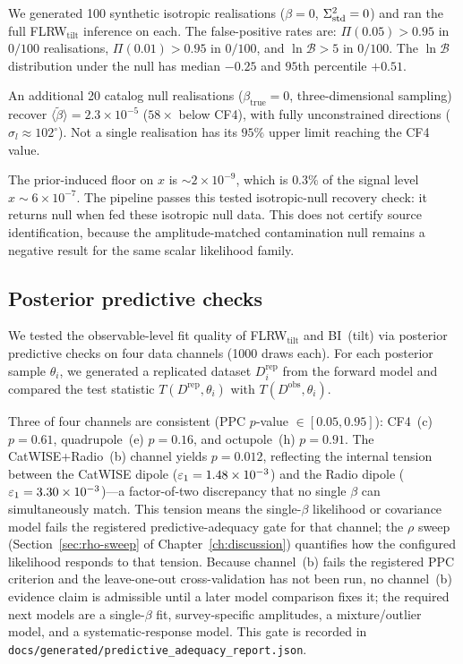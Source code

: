 We generated 100 synthetic isotropic realisations ($\beta = 0$,
$\Sigma^2_{\mathrm{std}} = 0$) and ran the full FLRW$_\mathrm{tilt}$ inference
on each.  The false-positive rates are: $\Pi(0.05) > 0.95$ in
$0/100$ realisations, $\Pi(0.01) > 0.95$ in $0/100$, and
$\ln\mathcal{B} > 5$ in $0/100$.  The $\ln\mathcal{B}$
distribution under the null has median $-0.25$ and $95$th
percentile $+0.51$.

An additional 20 catalog null realisations ($\beta_{\mathrm{true}} = 0$,
three-dimensional sampling) recover
$\langle\tilde{\beta}\rangle = 2.3 \times 10^{-5}$ ($58\times$
below CF4), with fully unconstrained directions
($\sigma_l \approx 102^\circ$).  Not a single realisation has its
$95\%$ upper limit reaching the CF4 value.

The prior-induced floor on $x$ is $\sim 2 \times 10^{-9}$,
which is $0.3\%$ of the signal level $x \sim 6 \times 10^{-7}$.
The pipeline passes this tested isotropic-null recovery check:
it returns null when fed these isotropic null data.  This does
not certify source identification, because the amplitude-matched
contamination null remains a negative result for the same scalar
likelihood family.


\subsection{Posterior predictive checks}
\label{sec:ppc}

We tested the observable-level fit quality of FLRW$_{\mathrm{tilt}}$
and BI~(tilt) via posterior predictive checks on four data
channels (1000 draws each).  For each posterior sample $\theta_i$,
we generated a replicated dataset $D_i^{\mathrm{rep}}$ from the
forward model and compared the test statistic
$T(D^{\mathrm{rep}}, \theta_i)$ with
$T(D^{\mathrm{obs}}, \theta_i)$.

Three of four channels are consistent (PPC $p$-value
$\in [0.05, 0.95]$): CF4~(c) $p = 0.61$, quadrupole~(e)
$p = 0.16$, and octupole~(h) $p = 0.91$.  The
CatWISE+Radio~(b) channel yields $p = 0.012$, reflecting the
internal tension between the CatWISE dipole
($\varepsilon_1 = 1.48 \times 10^{-3}$) and the Radio dipole
($\varepsilon_1 = 3.30 \times 10^{-3}$)---a factor-of-two discrepancy
that no single $\beta$ can simultaneously match.  This tension
means the single-$\beta$ likelihood or covariance model fails the
registered predictive-adequacy gate for that channel; the $\rho$
sweep (Section~\ref{sec:rho-sweep} of Chapter~\ref{ch:discussion})
quantifies how the configured likelihood responds to that tension.
Because channel~(b) fails the registered PPC criterion and the
leave-one-out cross-validation has not been run, no channel~(b)
evidence claim is admissible until a later model comparison fixes
it; the required next models are a single-$\beta$ fit,
survey-specific amplitudes, a mixture/outlier model, and a
systematic-response model.  This gate is recorded in
\texttt{docs/generated/predictive\_adequacy\_report.json}.

